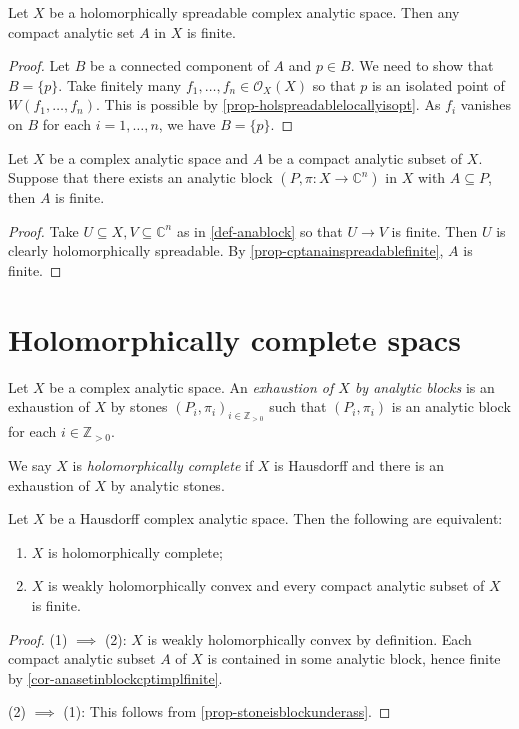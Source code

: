 \begin{proposition}\label{prop-cptanainspreadablefinite}
    Let $X$ be a holomorphically spreadable complex analytic space. Then any compact analytic set $A$ in $X$ is finite.
\end{proposition}
\begin{proof}
    Let $B$ be a connected component of $A$ and $p\in B$. We need to show that $B=\{p\}$. Take finitely many $f_1,\ldots,f_n\in \mathcal{O}_X(X)$ so that $p$ is an isolated point of $W(f_1,\ldots,f_n)$. This is possible by \cref{prop-holspreadablelocallyisopt}.
    As $f_i$ vanishes on $B$ for each $i=1,\ldots,n$, we have $B=\{p\}$.
\end{proof}
\begin{corollary}\label{cor-anasetinblockcptimplfinite}
    Let $X$ be a complex analytic space and $A$ be a compact analytic subset of $X$. Suppose that there exists an analytic block $(P,\pi:X\rightarrow \mathbb{C}^n)$ in $X$ with $A\subseteq P$, then $A$ is finite.
\end{corollary}
\begin{proof}
    Take $U\subseteq X,V\subseteq \mathbb{C}^n$ as in \cref{def-anablock} so that $U\rightarrow V$ is finite. Then $U$ is clearly holomorphically spreadable. By \cref{prop-cptanainspreadablefinite}, $A$ is finite.
\end{proof}

\section{Holomorphically complete spacs}

\begin{definition}
    Let $X$ be a complex analytic space. An \emph{exhaustion of $X$ by analytic blocks} is an exhaustion of $X$ by stones $(P_i,\pi_i)_{i\in \mathbb{Z}_{>0}}$ such that $(P_i,\pi_i)$ is an analytic block for each $i\in \mathbb{Z}_{>0}$.

    We say $X$ is \emph{holomorphically complete} if $X$ is Hausdorff and there is an exhaustion of $X$ by analytic stones.
\end{definition}
\begin{thm}
    Let $X$ be a Hausdorff complex analytic space. Then the following are equivalent:
    \begin{enumerate}
        \item $X$ is holomorphically complete;
        \item $X$ is weakly holomorphically convex and every compact analytic subset of $X$ is finite.
    \end{enumerate}
\end{thm}
\begin{proof}
    (1) $\implies$ (2): $X$ is weakly holomorphically convex by definition. Each compact analytic subset $A$ of $X$ is contained in some analytic block, hence finite by \cref{cor-anasetinblockcptimplfinite}.

    (2) $\implies$ (1): This follows from \cref{prop-stoneisblockunderass}.
\end{proof}

